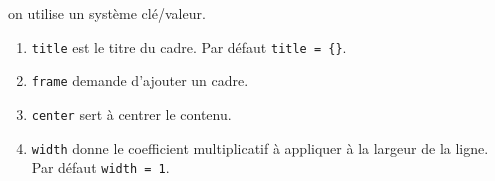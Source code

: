 \documentclass[12pt,a4paper]{article}
\begin{document}

\IDoption{} on utilise un système clé/valeur.
\begin{enumerate}
	\item \verb#title# est le titre du cadre.
	      Par défaut \verb#title = {}#.

	\item \verb#frame# demande d'ajouter un cadre.

	\item \verb#center# sert à centrer le contenu.

	\item \verb#width# donne le coefficient multiplicatif à appliquer à la largeur de la ligne.
	      Par défaut \verb#width = 1#.
\end{enumerate}
\end{document}
